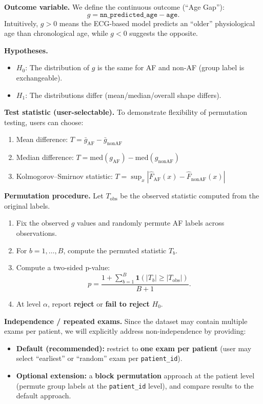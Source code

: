 \documentclass{article}
\begin{document}
\begin{normalsize}
    \noindent \textbf{Outcome variable.} We define the continuous outcome (``Age Gap''):
    \[
        g = \texttt{nn\_predicted\_age} - \texttt{age}.
    \]
    Intuitively, $g>0$ means the ECG-based model predicts an ``older'' physiological age than chronological age, while $g<0$ suggests the opposite.

    \vspace{0.5em}
    \noindent \textbf{Hypotheses.}
    \begin{itemize}
        \item $H_{0}$: The distribution of $g$ is the same for AF and non-AF (group label is exchangeable).
        \item $H_{1}$: The distributions differ (mean/median/overall shape differs).
    \end{itemize}

    \noindent \textbf{Test statistic (user-selectable).} To demonstrate flexibility of permutation testing, users can choose:
    \begin{enumerate}
        \item Mean difference: $T = \bar g_{\text{AF}} - \bar g_{\text{nonAF}}$
        \item Median difference: $T = \mathrm{med}(g_{\text{AF}}) - \mathrm{med}(g_{\text{nonAF}})$
        \item Kolmogorov--Smirnov statistic: $T = \sup_{x} | \hat F_{\text{AF}}(x) - \hat F_{\text{nonAF}}(x) |$
    \end{enumerate}

    \noindent \textbf{Permutation procedure.} Let $T_{\text{obs}}$ be the observed statistic computed from the original labels.
    \begin{enumerate}
        \item Fix the observed $g$ values and randomly permute AF labels across observations.
        \item For $b=1,\dots,B$, compute the permuted statistic $T_b$.
        \item Compute a two-sided p-value:
        \[
            p = \frac{1 + \sum_{b=1}^{B} \mathbf{1}\left(|T_b| \ge |T_{\text{obs}}|\right)}{B+1}.
        \]
        \item At level $\alpha$, report \textbf{reject} or \textbf{fail to reject} $H_0$.
    \end{enumerate}

    \noindent \textbf{Independence / repeated exams.} Since the dataset may contain multiple exams per patient, we will explicitly address non-independence by providing:
    \begin{itemize}
        \item \textbf{Default (recommended):} restrict to \textbf{one exam per patient} (user may select ``earliest'' or ``random'' exam per \texttt{patient\_id}).
        \item \textbf{Optional extension:} a \textbf{block permutation} approach at the patient level (permute group labels at the \texttt{patient\_id} level), and compare results to the default approach.
    \end{itemize}


\end{normalsize}
\end{document}
